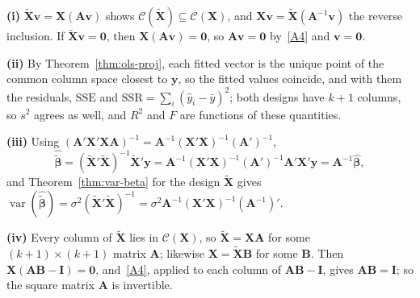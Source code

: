 \documentclass[12pt,a4paper]{article}
\makeatletter
\theoremstyle{definition}
\renewenvironment{proof}[1][\proofname]{\par
  \pushQED{\qed}%
  \normalfont \topsep6\p@\@plus6\p@\relax
  \trivlist
  \item[\hskip\labelsep\bfseries #1\@addpunct{.}]\ignorespaces
}{%
  \popQED\endtrivlist\@endpefalse
}
\DeclareMathOperator\var{var}
\newcommand{\SSR}{\mathrm{SSR}}
\newcommand{\SSE}{\mathrm{SSE}}
\newcommand{\bX}{\mathbf{X}}
\newcommand{\by}{\mathbf{y}}
\def\bb{\boldsymbol{\beta}}
\newcommand{\bI}{\mathbf{I}}
\newcommand{\bzero}{\mathbf{0}}
\newcommand{\bA}{\mathbf{A}}
\newcommand{\bv}{\mathbf{v}}
\newcommand{\calC}{\mathcal{C}}
\makeatother
\begin{document}
\begin{proof}
\textbf{(i)} $\tilde{\bX}\bv = \bX(\bA\bv)$ shows $\calC(\tilde{\bX}) \subseteq \calC(\bX)$, and $\bX\bv = \tilde{\bX}(\bA^{-1}\bv)$ the reverse inclusion. If $\tilde{\bX}\bv = \bzero$, then $\bX(\bA\bv) = \bzero$, so $\bA\bv = \bzero$ by~\ref{A4} and $\bv = \bzero$.

\textbf{(ii)} By Theorem~\ref{thm:ols-proj}, each fitted vector is the unique point of the common column space closest to $\by$, so the fitted values coincide, and with them the residuals, $\SSE$ and $\SSR = \sum_i(\hat y_i - \bar y)^2$; both designs have $k + 1$ columns, so $s^2$ agrees as well, and $R^2$ and $F$ are functions of these quantities.

\textbf{(iii)} Using $(\bA'\bX'\bX\bA)^{-1} = \bA^{-1}(\bX'\bX)^{-1}(\bA')^{-1}$,
\[
\hat{\tilde{\bb}} = (\tilde{\bX}'\tilde{\bX})^{-1}\tilde{\bX}'\by = \bA^{-1}(\bX'\bX)^{-1}(\bA')^{-1}\bA'\bX'\by = \bA^{-1}\hat{\bb},
\]
and Theorem~\ref{thm:var-beta} for the design $\tilde{\bX}$ gives $\var(\hat{\tilde{\bb}}) = \sigma^2(\tilde{\bX}'\tilde{\bX})^{-1} = \sigma^2\bA^{-1}(\bX'\bX)^{-1}(\bA^{-1})'$.

\textbf{(iv)} Every column of $\tilde{\bX}$ lies in $\calC(\bX)$, so $\tilde{\bX} = \bX\bA$ for some $(k+1) \times (k+1)$ matrix $\bA$; likewise $\bX = \tilde{\bX}\mathbf{B}$ for some $\mathbf{B}$. Then $\bX(\bA\mathbf{B} - \bI) = \bzero$, and~\ref{A4}, applied to each column of $\bA\mathbf{B} - \bI$, gives $\bA\mathbf{B} = \bI$; so the square matrix $\bA$ is invertible.
\end{proof}
\end{document}
